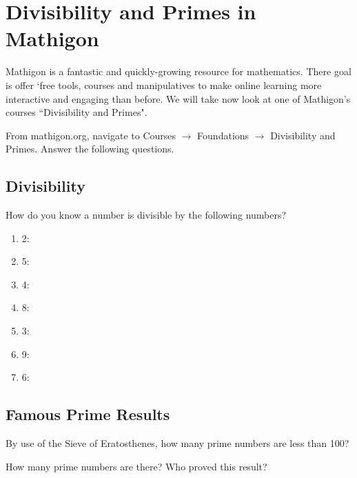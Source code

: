
\section{Divisibility and Primes in Mathigon}

Mathigon is a fantastic and quickly-growing resource for mathematics. There goal is offer `free tools, courses and manipulatives to make online learning more interactive and engaging than before. We will take now look at one of Mathigon's courses ``Divisibility and Primes".

\noindent From mathigon.org, navigate to Courses $\rightarrow$ Foundations $\rightarrow$ Divisibility and Primes. Answer the following questions.

\subsection{Divisibility}

\begin{exercise}
How do you know a number is divisible by the following numbers?
\end{exercise}

\begin{enumerate}
    \item 2: 
    \item 5:
    \item 4:
    \item 8:
    \item 3:
    \item 9:
    \item 6:
\end{enumerate}

\subsection{Famous Prime Results}

\begin{exercise}
By use of the Sieve of Eratosthenes, how many prime numbers are less than 100?
\end{exercise}

\vspace{1in}

\begin{exercise}
How many prime numbers are there? Who proved this result?
\end{exercise}

